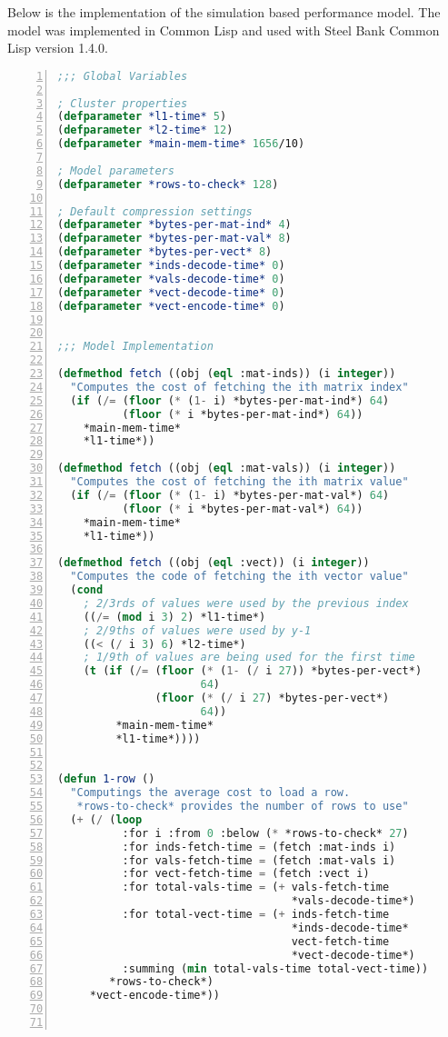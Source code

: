 Below is the implementation of the simulation based performance model.
The model was implemented in Common Lisp and used with Steel Bank Common Lisp version 1.4.0.

\begin{lstlisting}[language=Lisp,
					showstringspaces=false,
					numbers=left,
					numberstyle=\tiny]
;;; Global Variables

; Cluster properties
(defparameter *l1-time* 5)
(defparameter *l2-time* 12)
(defparameter *main-mem-time* 1656/10)

; Model parameters
(defparameter *rows-to-check* 128)

; Default compression settings
(defparameter *bytes-per-mat-ind* 4)
(defparameter *bytes-per-mat-val* 8)
(defparameter *bytes-per-vect* 8)
(defparameter *inds-decode-time* 0)
(defparameter *vals-decode-time* 0)
(defparameter *vect-decode-time* 0)
(defparameter *vect-encode-time* 0)


;;; Model Implementation

(defmethod fetch ((obj (eql :mat-inds)) (i integer))
  "Computes the cost of fetching the ith matrix index"
  (if (/= (floor (* (1- i) *bytes-per-mat-ind*) 64)
          (floor (* i *bytes-per-mat-ind*) 64))
    *main-mem-time*
    *l1-time*))

(defmethod fetch ((obj (eql :mat-vals)) (i integer))
  "Computes the cost of fetching the ith matrix value"
  (if (/= (floor (* (1- i) *bytes-per-mat-val*) 64)
          (floor (* i *bytes-per-mat-val*) 64))
    *main-mem-time*
    *l1-time*))

(defmethod fetch ((obj (eql :vect)) (i integer))
  "Computes the code of fetching the ith vector value"
  (cond
    ; 2/3rds of values were used by the previous index
    ((/= (mod i 3) 2) *l1-time*)
    ; 2/9ths of values were used by y-1
    ((< (/ i 3) 6) *l2-time*)
    ; 1/9th of values are being used for the first time
    (t (if (/= (floor (* (1- (/ i 27)) *bytes-per-vect*)
                      64)
               (floor (* (/ i 27) *bytes-per-vect*)
                      64))
         *main-mem-time*
         *l1-time*))))


(defun 1-row ()
  "Computings the average cost to load a row.
   *rows-to-check* provides the number of rows to use"
  (+ (/ (loop
          :for i :from 0 :below (* *rows-to-check* 27)
          :for inds-fetch-time = (fetch :mat-inds i)
          :for vals-fetch-time = (fetch :mat-vals i)
          :for vect-fetch-time = (fetch :vect i)
          :for total-vals-time = (+ vals-fetch-time
                                    *vals-decode-time*)
          :for total-vect-time = (+ inds-fetch-time
                                    *inds-decode-time*
                                    vect-fetch-time
                                    *vect-decode-time*)
          :summing (min total-vals-time total-vect-time))
        *rows-to-check*)
     *vect-encode-time*))



\end{lstlisting}
